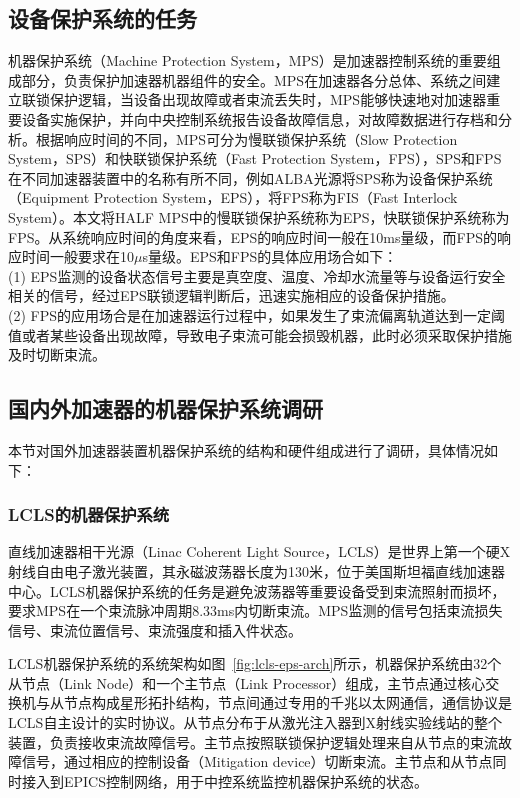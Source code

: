 \subsection{设备保护系统的任务}
机器保护系统（Machine Protection System，MPS）是加速器控制系统的重要组成部分，负责保护加速器机器组件的安全。MPS在加速器各分总体、系统之间建立联锁保护逻辑，当设备出现故障或者束流丢失时，MPS能够快速地对加速器重要设备实施保护，并向中央控制系统报告设备故障信息，对故障数据进行存档和分析。根据响应时间的不同，MPS可分为慢联锁保护系统（Slow Protection System，SPS）和快联锁保护系统（Fast Protection System，FPS），SPS和FPS在不同加速器装置中的名称有所不同，例如ALBA光源将SPS称为设备保护系统（Equipment Protection System，EPS），将FPS称为FIS（Fast Interlock System）\cite{Alba-eps}。本文将HALF MPS中的慢联锁保护系统称为EPS，快联锁保护系统称为FPS。从系统响应时间的角度来看，EPS的响应时间一般在10ms量级，而FPS的响应时间一般要求在10$\mu$s量级。EPS和FPS的具体应用场合如下：\\
(1) EPS监测的设备状态信号主要是真空度、温度、冷却水流量等与设备运行安全相关的信号，经过EPS联锁逻辑判断后，迅速实施相应的设备保护措施。\\
(2) FPS的应用场合是在加速器运行过程中，如果发生了束流偏离轨道达到一定阈值或者某些设备出现故障，导致电子束流可能会损毁机器，此时必须采取保护措施及时切断束流。

\subsection{国内外加速器的机器保护系统调研}
本节对国外加速器装置机器保护系统的结构和硬件组成进行了调研，具体情况如下：

\subsubsection{LCLS的机器保护系统}

直线加速器相干光源（Linac Coherent Light Source，LCLS）是世界上第一个硬X射线自由电子激光装置，其永磁波荡器长度为130米，位于美国斯坦福直线加速器中心。LCLS机器保护系统的任务是避免波荡器等重要设备受到束流照射而损坏，要求MPS在一个束流脉冲周期8.33ms内切断束流。MPS监测的信号包括束流损失信号、束流位置信号、束流强度和插入件状态。

LCLS机器保护系统的系统架构如图~\ref{fig:lcls-eps-arch}所示，机器保护系统由32个从节点（Link Node）和一个主节点（Link Processor）组成，主节点通过核心交换机与从节点构成星形拓扑结构，节点间通过专用的千兆以太网通信，通信协议是LCLS自主设计的实时协议。从节点分布于从激光注入器到X射线实验线站的整个装置，负责接收束流故障信号。主节点按照联锁保护逻辑处理来自从节点的束流故障信号，通过相应的控制设备（Mitigation device）切断束流。主节点和从节点同时接入到EPICS控制网络，用于中控系统监控机器保护系统的状态\cite{Norum-2009}。

